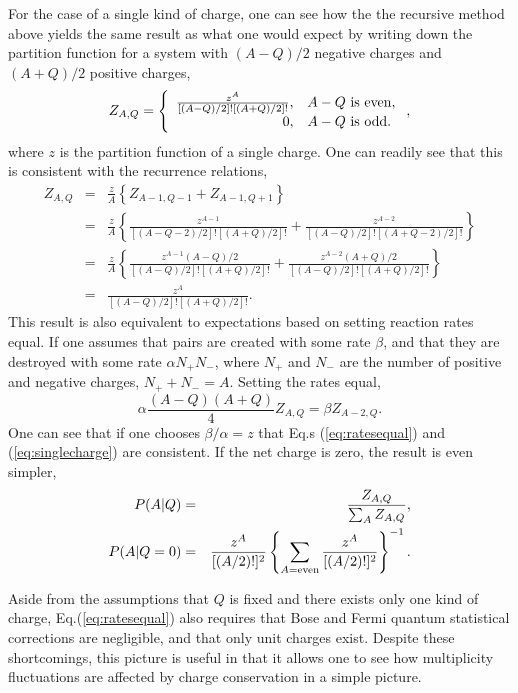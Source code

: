 For the case of a single kind of charge, one can see how the the recursive method above yields the same result as what one would expect by writing down the partition function for a system with $(A-Q)/2$ negative charges and $(A+Q)/2$ positive charges,
\begin{eqnarray}
\label{eq:singlecharge}
Z_{A,Q}=\left\{\begin{array}{rl}
\frac{z^A}{[(A-Q)/2]![(A+Q)/2]!},&A-Q~{\rm is~even},\\
0,&A-Q~{\rm is~odd}.\end{array}\right. ,
\end{eqnarray}
where $z$ is the partition function of a single charge. One can readily see that this is consistent with the recurrence relations,
\begin{eqnarray}
Z_{A,Q}&=&\frac{z}{A}\left\{Z_{A-1,Q-1}+Z_{A-1,Q+1}\right\}\\
\nonumber
&=&\frac{z}{A}\left\{\frac{z^{A-1}}{[(A-Q-2)/2]![(A+Q)/2]!}+\frac{z^{A-2}}{[(A-Q)/2]![(A+Q-2)/2]!}\right\}\\
\nonumber
&=&\frac{z}{A}\left\{\frac{z^{A-1}(A-Q)/2}{[(A-Q)/2]![(A+Q)/2]!}+\frac{z^{A-2}(A+Q)/2}{[(A-Q)/2]![(A+Q)/2]!}\right\}\\
&=&\frac{z^A}{[(A-Q)/2]![(A+Q)/2]!}.
\end{eqnarray}
This result is also equivalent to expectations based on setting reaction rates equal. If one assumes that pairs are created with some rate $\beta$, and that they are destroyed with some rate $\alpha N_+N_-$, where $N_+$ and $N_-$ are the number of positive and negative charges, $N_++N_-=A$. Setting the rates equal,
\begin{equation}\label{eq:ratesequal}
\alpha \frac{(A-Q)(A+Q)}{4}Z_{A,Q}=\beta Z_{A-2,Q}.
\end{equation}
One can see that if one chooses $\beta/\alpha=z$ that Eq.s (\ref{eq:ratesequal}) and (\ref{eq:singlecharge}) are consistent. If the net charge is zero, the result is even simpler,
\begin{eqnarray}
\label{eq:PAgivenQcanonical}
P(A|Q)&=&\frac{Z_{A,Q}}{\sum_A Z_{A,Q}},\\
\nonumber
P(A|Q=0)&=& \frac{z^A}{[(A/2)!]^2}\left\{\sum_{A={\rm even}} \frac{z^A}{[(A/2)!]^2}\right\}^{-1}.
\end{eqnarray}

Aside from the assumptions that $Q$ is fixed and there exists only one kind of charge, Eq.(\ref{eq:ratesequal}) also requires that Bose and Fermi quantum statistical corrections are negligible, and that only unit charges exist. Despite these shortcomings, this picture is useful in that it allows one to see how multiplicity fluctuations are affected by charge conservation in a simple picture. 
